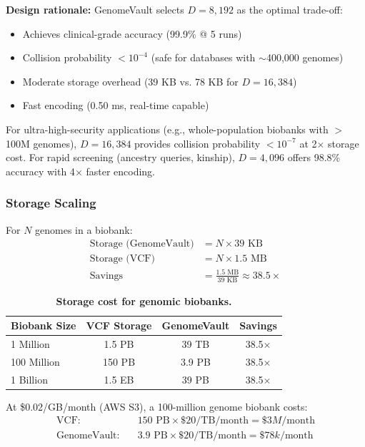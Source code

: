\documentclass[12pt,a4paper]{article}
\begin{document}
\textbf{Design rationale:} GenomeVault selects $D=8,192$ as the optimal trade-off:
\begin{itemize}
\item Achieves clinical-grade accuracy (99.9\% @ 5 runs)
\item Collision probability $<10^{-4}$ (safe for databases with $\sim$400,000 genomes)
\item Moderate storage overhead (39 KB vs. 78 KB for $D=16,384$)
\item Fast encoding (0.50 ms, real-time capable)
\end{itemize}

For ultra-high-security applications (e.g., whole-population biobanks with $>$100M genomes), $D=16,384$ provides collision probability $<10^{-7}$ at 2$\times$ storage cost. For rapid screening (ancestry queries, kinship), $D=4,096$ offers 98.8\% accuracy with 4$\times$ faster encoding.

\subsubsection{Storage Scaling}

For $N$ genomes in a biobank:
\begin{align*}
\text{Storage (GenomeVault)} &= N \times 39 \text{ KB} \\
\text{Storage (VCF)} &= N \times 1.5 \text{ MB} \\
\text{Savings} &= \frac{1.5 \text{ MB}}{39 \text{ KB}} \approx 38.5\times
\end{align*}

\begin{table}[h]
\centering
\caption{\textbf{Storage cost for genomic biobanks.}}
\begin{tabular}{lccc}
\toprule
\textbf{Biobank Size} & \textbf{VCF Storage} & \textbf{GenomeVault} & \textbf{Savings} \\
\midrule
1 Million & 1.5 PB & 39 TB & 38.5$\times$ \\
100 Million & 150 PB & 3.9 PB & 38.5$\times$ \\
1 Billion & 1.5 EB & 39 PB & 38.5$\times$ \\
\bottomrule
\end{tabular}
\end{table}

At \$0.02/GB/month (AWS S3), a 100-million genome biobank costs:
\begin{align*}
\text{VCF:} \quad & 150 \text{ PB} \times \$20/\text{TB}/\text{month} = \$3M/\text{month} \\
\text{GenomeVault:} \quad & 3.9 \text{ PB} \times \$20/\text{TB}/\text{month} = \$78k/\text{month}
\end{align*}
\end{document}
